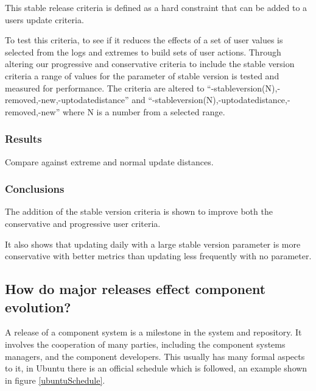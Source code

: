 This stable release criteria is defined as a hard constraint that can be added to a users update criteria.

To test this criteria, to see if it reduces the effects of a set of user values is selected from the logs and extremes to build sets of user actions.
Through altering our progressive and conservative criteria to include the stable version criteria a range of values for the parameter of stable version is tested and measured for performance.
The criteria are altered to ``-stableversion(N),-removed,-new,-uptodatedistance'' and ``-stableversion(N),-uptodatedistance,-removed,-new'' where N is a number from a selected range.

\subsubsection{Results}
Compare against extreme and normal update distances.

\subsubsection{Conclusions}
The addition of the stable version criteria is shown to improve both the conservative and progressive user criteria.

It also shows that updating daily with a large stable version parameter is more conservative with better metrics than updating less frequently with no parameter.

\subsection{How do major releases effect component evolution?}
A release of a component system is a milestone in the system and repository.
It involves the cooperation of many parties, including the component systems managers, and the component developers.
This usually has many formal aspects to it, in Ubuntu there is an official schedule which is followed, an example shown in figure \ref{ubuntuSchedule}.

